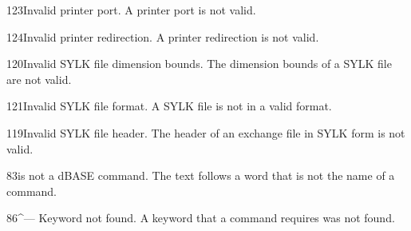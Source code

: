 \begin{XbaseMessageEntry}{123}{Invalid printer port.}
A printer port is not valid.
\end{XbaseMessageEntry}

\begin{XbaseMessageEntry}{124}{Invalid printer redirection.}
A printer redirection is not valid.
\end{XbaseMessageEntry}

\begin{XbaseMessageEntry}{120}{Invalid SYLK file dimension bounds.}
The dimension bounds of a SYLK file are not valid.
\end{XbaseMessageEntry}

\begin{XbaseMessageEntry}{121}{Invalid SYLK file format.}
A SYLK file is not in a valid format.
\end{XbaseMessageEntry}

\begin{XbaseMessageEntry}{119}{Invalid SYLK file header.}
The header of an exchange file in SYLK form is not valid.
\end{XbaseMessageEntry}

\begin{XbaseMessageEntry}{83}{is not a dBASE command.}
The text follows a word that is not the name of a command.
\end{XbaseMessageEntry}

\begin{XbaseMessageEntry}{86}{^--- Keyword not found.}
A keyword that a command requires was not found.
\end{XbaseMessageEntry}

